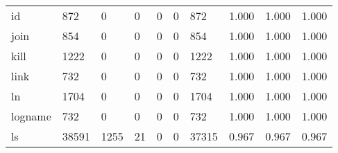 \begin{longtable}{lp{1.3cm}p{1.3cm}p{1.3cm}p{1.3cm}p{1.3cm}p{1.3cm}p{1.3cm}p{1.3cm}p{1.3cm}}
id        &                    872 &                                  0 &                                 0 &                                0 &                                 0 &                             872 &                                1.000 &                                  1.000 &                                1.000 \\
join      &                    854 &                                  0 &                                 0 &                                0 &                                 0 &                             854 &                                1.000 &                                  1.000 &                                1.000 \\
kill      &                   1222 &                                  0 &                                 0 &                                0 &                                 0 &                            1222 &                                1.000 &                                  1.000 &                                1.000 \\
link      &                    732 &                                  0 &                                 0 &                                0 &                                 0 &                             732 &                                1.000 &                                  1.000 &                                1.000 \\
ln        &                   1704 &                                  0 &                                 0 &                                0 &                                 0 &                            1704 &                                1.000 &                                  1.000 &                                1.000 \\
logname   &                    732 &                                  0 &                                 0 &                                0 &                                 0 &                             732 &                                1.000 &                                  1.000 &                                1.000 \\
ls        &                  38591 &                               1255 &                                21 &                                0 &                                 0 &                           37315 &                                0.967 &                                  0.967 &                                0.967 \\

\end{longtable}
